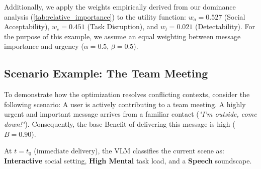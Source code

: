 \begin{table}[H]
\centering
\caption{Normalized empirical cost matrix ($0.0 = \text{Min Cost}, 1.0 = \text{Max Cost}$). Derived by mapping the descriptive means from the formative study into the $[0,1]$ space.}
\label{tab:normalized_costs}
\end{table}

Additionally, we apply the weights empirically derived from our dominance analysis (\autoref{tab:relative_importance}) to the utility function: $w_a = 0.527$ (Social Acceptability), $w_e = 0.451$ (Task Disruption), and $w_l = 0.021$ (Detectability). For the purpose of this example, we assume an equal weighting between message importance and urgency ($\alpha = 0.5$, $\beta = 0.5$).

\subsection{Scenario Example: The Team Meeting}

To demonstrate how the optimization resolves conflicting contexts, consider the following scenario: A user is actively contributing to a team meeting. A highly urgent and important message arrives from a familiar contact (\textit{"I'm outside, come down!"}). Consequently, the base Benefit of delivering this message is high ($B = 0.90$).

At $t=t_0$ (immediate delivery), the VLM classifies the current scene as: \textbf{Interactive} social setting, \textbf{High Mental} task load, and a \textbf{Speech} soundscape. 

